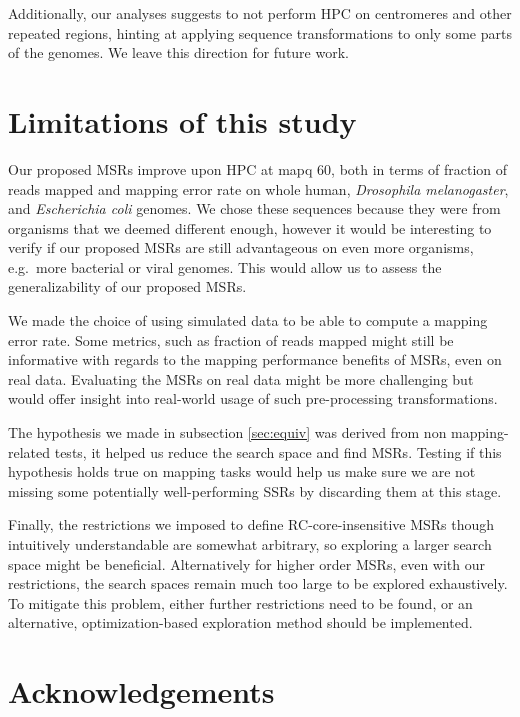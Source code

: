 \documentclass[
  11pt,
  twoside,
  BCOR=10mm,
  listof=totoc]{scrbook}
\begin{document}
Additionally, our analyses suggests to not perform HPC on centromeres and other repeated regions, hinting at applying sequence transformations to only some parts of the genomes. We leave this direction for future work.

\hypertarget{limitations-of-this-study}{%
\section{Limitations of this study}\label{limitations-of-this-study}}

Our proposed MSRs improve upon HPC at mapq 60, both in terms of fraction of reads mapped and mapping error rate on whole human, \emph{Drosophila melanogaster}, and \emph{Escherichia coli} genomes. We chose these sequences because they were from organisms that we deemed different enough, however it would be interesting to verify if our proposed MSRs are still advantageous on even more organisms, e.g.~more bacterial or viral genomes. This would allow us to assess the generalizability of our proposed MSRs.

We made the choice of using simulated data to be able to compute a mapping error rate. Some metrics, such as fraction of reads mapped might still be informative with regards to the mapping performance benefits of MSRs, even on real data. Evaluating the MSRs on real data might be more challenging but would offer insight into real-world usage of such pre-processing transformations.

The hypothesis we made in subsection \ref{sec:equiv} was derived from non mapping-related tests, it helped us reduce the search space and find MSRs. Testing if this hypothesis holds true on mapping tasks would help us make sure we are not missing some potentially well-performing SSRs by discarding them at this stage.

Finally, the restrictions we imposed to define RC-core-insensitive MSRs though intuitively understandable are somewhat arbitrary, so exploring a larger search space might be beneficial. Alternatively for higher order MSRs, even with our restrictions, the search spaces remain much too large to be explored exhaustively. To mitigate this problem, either further restrictions need to be found, or an alternative, optimization-based exploration method should be implemented.

\hypertarget{acknowledgements}{%
\section*{Acknowledgements}\label{acknowledgements}}
\end{document}
